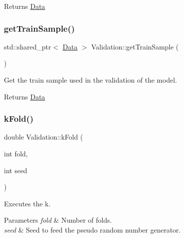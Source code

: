 \begin{DoxyReturn}{Returns}
\hyperlink{class_data}{Data} 
\end{DoxyReturn}
\mbox{\label{class_validation_ae31ccc41bcfe7e3269cde8bed2ed4cc9}} 
\subsubsection{\texorpdfstring{get\+Train\+Sample()}{getTrainSample()}}
{\footnotesize\ttfamily std\+::shared\+\_\+ptr$<$ \hyperlink{class_data}{Data} $>$ Validation\+::get\+Train\+Sample (\begin{DoxyParamCaption}{ }\end{DoxyParamCaption})}



Get the train sample used in the validation of the model. 

\begin{DoxyReturn}{Returns}
\hyperlink{class_data}{Data} 
\end{DoxyReturn}
\mbox{\label{class_validation_a3aae72caef37b12a57aaf5cdd862de3a}} 
\subsubsection{\texorpdfstring{k\+Fold()}{kFold()}}
{\footnotesize\ttfamily double Validation\+::k\+Fold (\begin{DoxyParamCaption}\item[{int}]{fold,  }\item[{int}]{seed }\end{DoxyParamCaption})}



Executes the k. 


\begin{DoxyParams}{Parameters}
{\em fold} & Number of folds. \\
\hline
{\em seed} & Seed to feed the pseudo random number generator. \\
\hline
\end{DoxyParams}
\mbox{\label{class_validation_afc2e7f15bc873853b70e2cc3c47eecdc}} 
